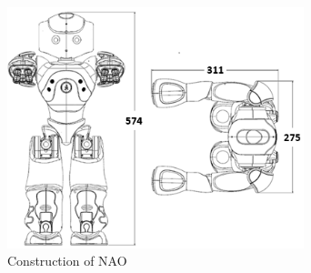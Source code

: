 \begin{figure}
	[h] \centering 
	\includegraphics[height=7cm]{figures/content/nao-construction.png} \caption{Construction of NAO} \label{fg:nao:construction} 
\end{figure}
